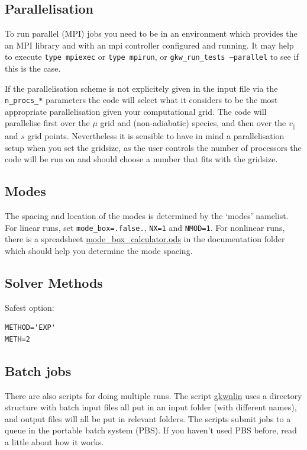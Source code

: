\documentclass[a4paper,10pt]{article}
\newcommand{\doc}[1]{\href{http://bitbucket.org/gkw/gkw/src/HEAD/doc/#1}{#1}}
\newcommand{\scripts}[1]{\href{http://bitbucket.org/gkw/gkw/src/HEAD/scripts/#1}{#1}}
\begin{document}
\subsection{Parallelisation}
To run parallel (MPI) jobs you need to be in an environment which
provides the an MPI library and with an mpi controller configured and
running. It may help to execute \texttt{type mpiexec} or \texttt{type
  mpirun}, or \texttt{gkw\_run\_tests --parallel} to see if this is the
case.

If the parallelisation scheme is not explicitely given in the input
file via the \texttt{n\_procs\_*} parameters the code will select what
it considers to be the most appropriate parallelisation given your
computational grid.  The code will parallelise first
over the $\mu$ grid and (non-adiabatic) species, and then over the
$v_{\parallel}$ and $s$ grid points.  Nevertheless it is sensible to
have in mind a parallelisation setup when you set the gridsize, as the
user controls the number of processors the code will be run on and
should choose a number that fits with the gridsize.

\subsection{Modes}
The spacing and location of the modes is determined by the `modes' namelist.   For linear runs, set \texttt{mode\_box=.false.}, \texttt{NX=1} and \texttt{NMOD=1}.  For nonlinear runs, there is a spreadsheet \doc{mode\_box\_calculator.ods} in the documentation folder which should help you determine the mode spacing.

\subsection{Solver Methods}
Safest option:
\begin{verbatim}
METHOD='EXP'
METH=2
\end{verbatim}

\subsection{Batch jobs}
There are also scripts for doing multiple runs. The script \scripts{gkwnlin}  uses a directory structure with batch input files all put in an input folder (with different names), and output files will all be put in relevant folders.  The scripts submit jobs to a queue in the portable batch system (PBS).  If you haven't used PBS before, read a little about how it works.
\end{document}
